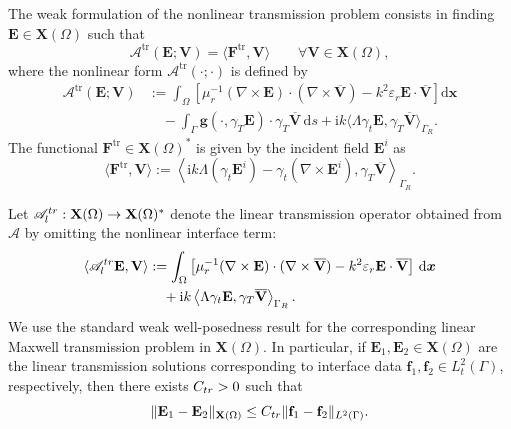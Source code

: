 \documentclass[10pt,a4paper]{amsart}
\numberwithin{equation}{section}
\begin{document}
The weak formulation of the nonlinear transmission problem consists in finding $\mathbf{E} \in \mathbf{X}(\Omega)$ such that
\[
\mathcal{A}^{\mathrm{tr}}(\mathbf{E}; \mathbf{V}) = \langle \mathbf{F}^{\mathrm{tr}}, \mathbf{V} \rangle \qquad \forall \mathbf{V} \in \mathbf{X}(\Omega),
\]
where the nonlinear form $\mathcal{A}^{\mathrm{tr}}(\cdot; \cdot)$ is defined by
\begin{equation}\label{eq:alternative_form}
\begin{aligned}
\mathcal{A}^{\mathrm{tr}}(\mathbf{E}; \mathbf{V}) &:= \int_{\Omega} \left[ \mu_r^{-1}(\nabla \times \mathbf{E}) \cdot (\nabla \times \overline{\mathbf{V}}) - k^2 \varepsilon_r \mathbf{E} \cdot \overline{\mathbf{V}} \right] \mathrm{d}\boldsymbol{x} \\
&\quad - \int_{\Gamma} \mathbf{g}(\cdot, \gamma_T \mathbf{E}) \cdot \gamma_T \overline{\mathbf{V}} \,\mathrm{d}s + \mathrm{i}k \langle \Lambda \gamma_t \mathbf{E}, \gamma_T \overline{\mathbf{V}} \rangle_{\Gamma_R}.
\end{aligned}
\end{equation}
The functional $\mathbf{F}^{\mathrm{tr}} \in \mathbf{X}(\Omega)^*$ is given by the incident field $\mathbf{E}^i$ as
\[
\langle \mathbf{F}^{\mathrm{tr}}, \mathbf{V} \rangle := \left\langle \mathrm{i}k \Lambda (\gamma_t \mathbf{E}^i) - \gamma_t (\nabla \times \mathbf{E}^i), \gamma_T \overline{\mathbf{V}} \right\rangle_{\Gamma_R}.
\]



Let \(\mathscr A_l^{\rm tr}:\mathbf X(\Omega)\to\mathbf X(\Omega)^*\) denote the
linear transmission operator obtained from \(\mathcal A\) by omitting the
nonlinear interface term:
\[
\begin{aligned}
\langle \mathscr  A_l^{\rm tr}\mathbf E,\mathbf V\rangle
&:=
\int_\Omega
\left[
\mu_r^{-1}(\nabla\times\mathbf E)
\cdot(\nabla\times\overline{\mathbf V})
-
k^2\varepsilon_r\mathbf E\cdot\overline{\mathbf V}
\right]\,\mathrm d\boldsymbol{x}
\\
&\quad
+
\mathrm i k
\left\langle
\Lambda\gamma_t\mathbf E,
\gamma_T\overline{\mathbf V}
\right\rangle_{\Gamma_R}.
\end{aligned}
\]
We use the standard weak well-posedness result for the corresponding linear
Maxwell transmission problem in \(\mathbf X(\Omega)\). In particular, if
\(\mathbf E_1,\mathbf E_2\in\mathbf X(\Omega)\) are the linear transmission
solutions corresponding to interface data
\(\mathbf f_1,\mathbf f_2\in L_t^2(\Gamma)\), respectively, then there exists
\(C_{\rm tr}>0\) such that
\begin{equation}\label{eq:linear_transmission_stability}
\|\mathbf E_1-\mathbf E_2\|_{\mathbf X(\Omega)}
\le
C_{\rm tr}
\|\mathbf f_1-\mathbf f_2\|_{L^2(\Gamma)} .
\end{equation}
\end{document}
